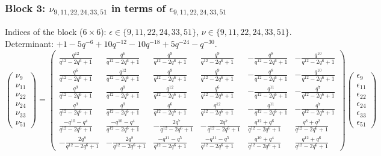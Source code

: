 \subsubsection{Block 3: $\nu_{9, 11, 22, 24, 33, 51}$ in terms of $\epsilon_{9, 11, 22, 24, 33, 51}$}
Indices of the block ($6\times 6$): $\epsilon \in \{9, 11, 22, 24, 33, 51\}$, $\nu \in \{9, 11, 22, 24, 33, 51\}$.
Determinant: $+1-5q^{-6}+10q^{-12}-10q^{-18}+5q^{-24}-q^{-30}$.
\[
\begin{pmatrix}
\nu_{9} \\
\nu_{11} \\
\nu_{22} \\
\nu_{24} \\
\nu_{33} \\
\nu_{51}
\end{pmatrix}
=
\begin{pmatrix}
\frac{q^{12}}{q^{12}-2q^{6}+1} & \frac{q^{6}}{q^{12}-2q^{6}+1} & \frac{q^{9}}{q^{12}-2q^{6}+1} & \frac{q^{9}}{q^{12}-2q^{6}+1} & -\frac{q^{8}}{q^{12}-2q^{6}+1} & -\frac{q^{10}}{q^{12}-2q^{6}+1} \\
\frac{q^{6}}{q^{12}-2q^{6}+1} & \frac{q^{12}}{q^{12}-2q^{6}+1} & \frac{q^{9}}{q^{12}-2q^{6}+1} & \frac{q^{9}}{q^{12}-2q^{6}+1} & -\frac{q^{8}}{q^{12}-2q^{6}+1} & -\frac{q^{10}}{q^{12}-2q^{6}+1} \\
\frac{q^{9}}{q^{12}-2q^{6}+1} & \frac{q^{9}}{q^{12}-2q^{6}+1} & \frac{q^{12}}{q^{12}-2q^{6}+1} & \frac{q^{6}}{q^{12}-2q^{6}+1} & -\frac{q^{11}}{q^{12}-2q^{6}+1} & -\frac{q^{7}}{q^{12}-2q^{6}+1} \\
\frac{q^{9}}{q^{12}-2q^{6}+1} & \frac{q^{9}}{q^{12}-2q^{6}+1} & \frac{q^{6}}{q^{12}-2q^{6}+1} & \frac{q^{12}}{q^{12}-2q^{6}+1} & -\frac{q^{11}}{q^{12}-2q^{6}+1} & -\frac{q^{7}}{q^{12}-2q^{6}+1} \\
\frac{-q^{10}-q^{4}}{q^{12}-2q^{6}+1} & \frac{-q^{10}-q^{4}}{q^{12}-2q^{6}+1} & -\frac{2q^{7}}{q^{12}-2q^{6}+1} & -\frac{2q^{7}}{q^{12}-2q^{6}+1} & \frac{q^{12}+q^{6}}{q^{12}-2q^{6}+1} & \frac{q^{8}+q^{2}}{q^{12}-2q^{6}+1} \\
-\frac{2q^{8}}{q^{12}-2q^{6}+1} & -\frac{2q^{8}}{q^{12}-2q^{6}+1} & \frac{-q^{11}-q^{5}}{q^{12}-2q^{6}+1} & \frac{-q^{11}-q^{5}}{q^{12}-2q^{6}+1} & \frac{q^{10}+q^{4}}{q^{12}-2q^{6}+1} & \frac{q^{12}+q^{6}}{q^{12}-2q^{6}+1}
\end{pmatrix}
\begin{pmatrix}
\epsilon_{9} \\
\epsilon_{11} \\
\epsilon_{22} \\
\epsilon_{24} \\
\epsilon_{33} \\
\epsilon_{51}
\end{pmatrix}
\]

